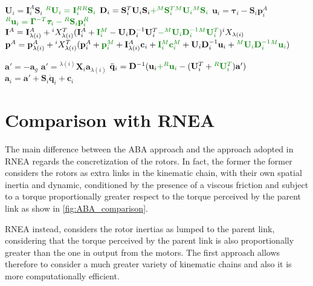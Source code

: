 \begin{algorithm}[H]
\begin{algorithmic}[1]
        \STATE $\mathbf{U}_i = \mathbf{I}_i ^A \mathbf{S}_i$
        \STATE $\color{webgreen}{{}^R\mathbf{U}_i = \mathbf{I}_i ^R {}^R\mathbf{S}_i}$
        \STATE $\mathbf{D} _i = \mathbf{S} ^T _i  {} \mathbf{U} _i \mathbf{S} _i \textcolor{webgreen}{+ {} ^M\mathbf{S} ^T _i  {} ^M\mathbf{U} _i {} ^M\mathbf{S} _i}$
        \STATE $\mathbf{u}_i = \boldsymbol{\tau}_i - \mathbf{S}_i\mathbf{p}_i^A$
        \STATE $\color{webgreen}{{}^R\mathbf{u}_i = \boldsymbol{\Gamma}^{-T}\boldsymbol{\tau}_i - {}^R\mathbf{S}_i\mathbf{p}_i^R}$
        \STATE $\mathbf{I} ^A = \mathbf{I} ^A _{\lambda (i)} + {} ^i X _{\lambda (i)} ^T (\mathbf{I} _i ^A + \textcolor{webgreen}{\mathbf{I} _i ^M } - {}  \mathbf{U} _i  \mathbf{D} ^{-1} _i  {}  \mathbf{U} ^T _i \textcolor{webgreen}{- {} ^M \mathbf{U} _i  \mathbf{D} ^{-1} _i {} ^M \mathbf{U} ^T _i}) {} ^i X _{\lambda (i)} $
        \STATE $\mathbf{p} ^A = \mathbf{p} ^A _{\lambda (i)} + {} ^i X _{\lambda (i)} ^T (\mathbf{p} ^A_i + \textcolor{webgreen}{\mathbf{p} ^M_i } + \mathbf{I} ^A _{\lambda (i)}  \mathbf{c}_i + \textcolor{webgreen}{\mathbf{I} {} ^M _i \mathbf{c} ^M _i }+ {}  \mathbf{U} _i \mathbf{D} ^{-1} _i {} \mathbf{u} _i + \textcolor{webgreen}{{} ^M \mathbf{U} _i \mathbf{D} ^{-1} _i {} ^M\mathbf{u} _i}) $
        \ENDIF
        \ENDFOR

        \STATE $\mathbf{a}' = -\mathbf{a}_g$
        \ELSE
        \STATE $\mathbf{a}' = {}^{\lambda(i)}\mathbf{X}_i \mathbf{a}_{\lambda(i)}$
        \STATE $\ddot{\mathbf{q}}_i = \mathbf{D}^{-1} (\mathbf{u}_i \textcolor{webgreen}{+ {}^R\mathbf{u}_i }- (\mathbf{U}_i^T + \textcolor{webgreen}{{}^R\mathbf{U}_i^T})\mathbf{a}')$
        \STATE $\mathbf{a}_i = \mathbf{a}' + \mathbf{S}_i\mathbf{\ddot{q}}_i + \mathbf{c} _i$
        \ENDIF
        \ENDFOR
    \end{algorithmic}
\end{algorithm}

\section{Comparison with RNEA}

The main difference between the \ac{ABA} approach and the approach adopted in \ac{RNEA} regards the concretization of the rotors. In fact, the former the former considers the rotors as extra links in the kinematic chain, with their own spatial inertia and dynamic, conditioned by the presence of a viscous friction and subject to a torque proportionally greater respect to the torque perceived by the parent link as show in \ref{fig:ABA_comparison}.


\ac{RNEA} instead, considers the rotor inertias as lumped to the parent link, considering that the torque perceived by the parent link is also proportionally greater than the one in output from the motors. The first approach allows therefore to consider a much greater variety of kinematic chains and also it is more computationally efficient.